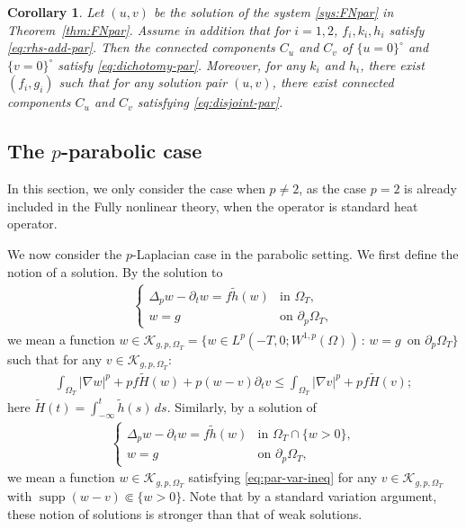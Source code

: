 \documentclass[11pt,oneside,english]{amsart}
\newcommand{\cK}{{\mathcal K}}
\newcommand{\supp}{\operatorname{supp}}
\newcommand{\D}{\nabla}
\numberwithin{equation}{section}
\theoremstyle{plain}
\newtheorem{corollary}{Corollary}
\numberwithin{equation}{section}
\begin{document}
    \begin{corollary}\label{cor:FNpar-coin}
  Let $(u,v)$ be the solution of the system \eqref{sys:FNpar} in Theorem~\ref{thm:FNpar}. Assume in addition that for  $i=1,2$, $f_i, k_i,h_i$ satisfy \eqref{eq:rhs-add-par}.  Then the connected components  $C_u$ and $C_v$ of  $\{u=0\}^\circ$ and $\{v=0\}^\circ$ satisfy
  \eqref{eq:dichotomy-par}. Moreover, for any $k_i$ and $h_i$, there exist $(f_i,g_i)$ such that for any solution pair  $(u,v)$, there exist connected components $C_u$ and $C_v$  satisfying \eqref{eq:disjoint-par}.
\end{corollary}





\subsection{The \texorpdfstring{$p$-parabolic}{p-parabolic}  case}\label{sec:p-par}

In this section, %
we only consider the case when $p \neq 2$, as the case $p=2$ is already included in the Fully nonlinear theory, when the operator is standard heat operator.

We now consider the $p$-Laplacian case in the parabolic setting. 
We first define the notion of a solution.  By the solution to
\begin{align}\label{eq:p-sol-par}
    \begin{cases}
        \Delta_pw-\partial_tw=f\tilde h(w)&\text{in }\Omega_T,\\
        w=g&\text{on }\partial_p\Omega_T,
    \end{cases}
\end{align} 
we mean a function $w\in \cK_{g,p,\Omega_T}=\{w\in L^p(-T,0;W^{1,p}(\Omega)) \,:\, w=g\,\,\,\text{on }\partial_p\Omega_T\}$ such that  for any $v\in \cK_{g,p,\Omega_T}$:
\begin{align}
    \label{eq:par-var-ineq}
    \int_{\Omega_T}|\D w|^p+pf\tilde H(w)+p(w-v)\partial_tv\le \int_{\Omega_T}|\D v|^p+pf\tilde H(v);
\end{align} 
 here $\tilde H(t)=\int_{-\infty}^t\tilde h(s)\,ds$.  Similarly, by a solution of 
\begin{align*}
    \begin{cases}
        \Delta_pw-\partial_tw=f\tilde h(w)&\text{in }\Omega_T\cap\{w>0\},\\
        w=g&\text{on }\partial_p\Omega_T,
    \end{cases}
\end{align*}
we mean a function $w\in \cK_{g,p,\Omega_T}$ satisfying \eqref{eq:par-var-ineq} for any $v\in \cK_{g,p,\Omega_T}$ with $\supp(w-v)\Subset\{w>0\}$. Note that by a standard variation argument, these notion of solutions is stronger than that of weak solutions.
\end{document}
